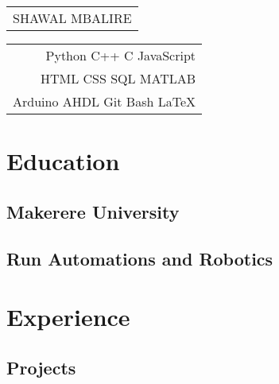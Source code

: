\documentclass[10pt,a4paper,twocolumn]{article}
\begin{document}
\hfil{\Large\bfseries\begin{tabular}[c]{c}
    SHAWAL MBALIRE
\end{tabular}}\hfil{\small\begin{tabular}[c]{r}
    Python C++ C JavaScript \\
    HTML CSS SQL MATLAB \\
    Arduino AHDL Git Bash LaTeX
\end{tabular}}\hfil\bigskip




\section*{Education}%
\subsection*{Makerere University}
\subsection*{Run Automations and Robotics}

\section*{Experience}
\subsection*{Projects}
\end{document}
